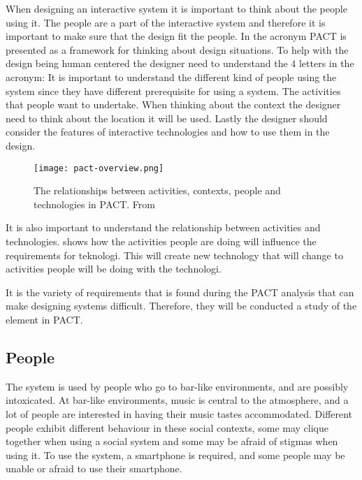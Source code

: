 When designing an interactive system it is important to think about the people using it. The people are a part of the interactive system and therefore it is important to make sure that the design fit the people. In \cite{benyon2013designing} the acronym PACT is presented as a framework for thinking about design situations. To help with the design being human centered the designer need to understand the 4 letters in the acronym: It is important to understand the different kind of people using the system since they have different prerequisite for using a system. The activities that people want to undertake. When thinking about the context the designer need to think about the location it will be used. Lastly the designer should consider the features of interactive technologies and how to use them in the design.

\begin{figure}
  \centering
  \texttt{[image: pact-overview.png]}
  \caption{The relationships between activities, contexts, people and technologies in PACT. From \cite{benyon2013designing}}
  \label{fig:pact-overview}
\end{figure}

It is also important to understand the relationship between activities and technologies.  shows how the activities people are doing will influence the requirements for teknologi. This will create new technology that will change to activities people will be doing with the technologi.

It is the variety of requirements that is found during the PACT analysis that can make designing systems difficult. Therefore, they will be conducted a study of the element in PACT.


\subsection{People}
\label{sub:pact_people}

The system is used by people who go to bar-like environments, and are possibly intoxicated. At bar-like environments, music is central to the atmosphere, and a lot of people are interested in having their music tastes accommodated. Different people exhibit different behaviour in these social contexts, some may clique together when using a social system and some may be afraid of stigmas when using it. To use the system, a smartphone is required, and some people may be unable or afraid to use their smartphone.

